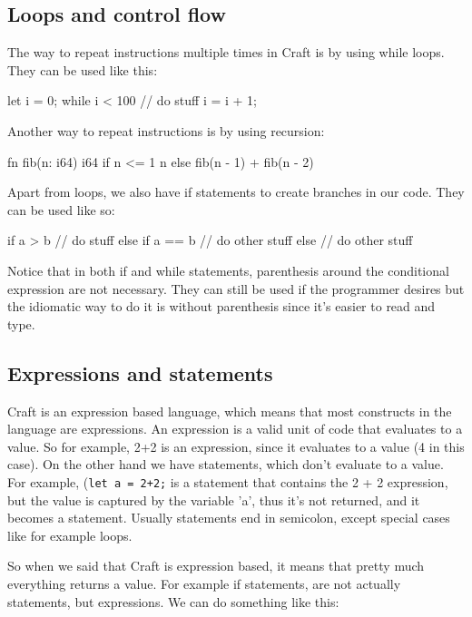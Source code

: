 ﻿\documentclass[10pt,a4paper,twocolumn,twoside]{article}
\begin{document}
\subsection{Loops and control flow}
The way to repeat instructions multiple times in Craft is by using while loops.
They can be used like this:
\begin{code}
    let i = 0;
    while i < 100 {
        // do stuff
        i = i + 1;
    }
\end{code}

Another way to repeat instructions is by using recursion:
\begin{code}
fn fib(n: i64) i64 {
    if n <= 1 {
        n
    } else {
        fib(n - 1) + fib(n - 2)
    }
}
\end{code}

Apart from loops, we also have if statements to create branches in our code. 
They can be used like so:

\begin{code}
    if a > b {
        // do stuff
    } else if a == b {
        // do other stuff
    } else {
        // do other stuff
    }
\end{code}

Notice that in both if and while statements, parenthesis around the conditional 
expression are not necessary. They can still be used if the programmer desires
but the idiomatic way to do it is without parenthesis since it's easier to read 
and type.

\subsection{Expressions and statements}
Craft is an expression based language, which means that most constructs in the
language are expressions. An expression is a valid unit of code that evaluates
to a value. So for example, 2+2 is an expression, since it evaluates to a value
(4 in this case). On the other hand we have statements, which don't evaluate to
a value. For example, (\texttt{let a = 2+2;} is a statement that contains the 2
+ 2 expression, but the value is captured by the variable 'a', thus it's not
returned, and it becomes a statement. Usually statements end in semicolon,
except special cases like for example loops.

So when we said that Craft is expression based, it means that pretty much
everything returns a value. For example if statements, are not actually
statements, but expressions. We can do something like this:
\end{document}

